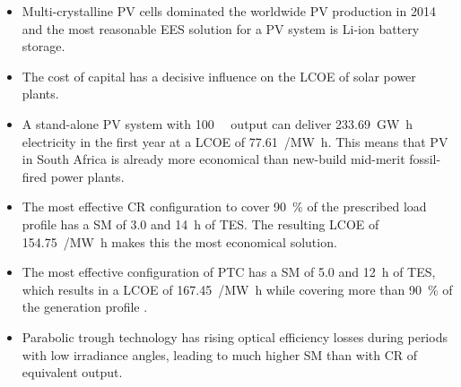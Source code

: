 \begin{itemize}
\item Multi-crystalline PV cells dominated the worldwide PV production in 2014 and the most reasonable EES solution for a PV system is  Li-ion battery storage.

\item The cost of capital has a decisive influence on the LCOE of solar power plants.


\item A stand-alone PV system with \SI{100}{\mega\wattsac} output can deliver \SI{233.69}{\giga\watt\hour} electricity in the first year at a LCOE of \SI{77.61}{\usd/\mega\watt\hour}. This means that PV in South Africa is already more economical than new-build mid-merit fossil-fired power plants.


\item The most effective CR configuration to cover \SI{90}{\percent} of the prescribed load profile has a SM of \num{3.0} and \SI{14}{\hour} of TES. The resulting LCOE of \SI{154.75}{\usd/\mega\watt\hour} makes this the most economical solution.


\item The most effective configuration of PTC has a SM of \num{5.0} and \SI{12}{\hour} of TES, which results in a LCOE of \SI{167.45}{\usd/\mega\watt\hour} while covering more than \SI{90}{\percent} of the generation profile .

\item Parabolic trough technology has rising optical efficiency losses during periods with low irradiance angles, leading to much higher SM than with CR of equivalent output.


\end{itemize}
